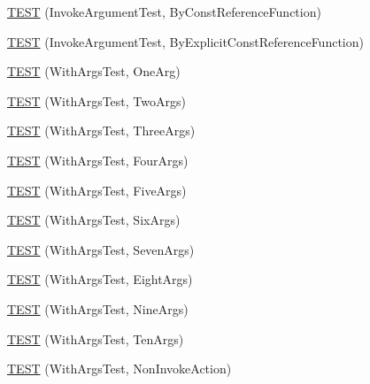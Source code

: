 \begin{DoxyCompactItemize}
\item 
\mbox{\hyperlink{namespacetesting_1_1gmock__generated__actions__test_a82aff636cad2f441c584fc8e3c057d56}{T\+E\+ST}} (Invoke\+Argument\+Test, By\+Const\+Reference\+Function)
\item 
\mbox{\hyperlink{namespacetesting_1_1gmock__generated__actions__test_accb544431629bfb38a618343daaa54c2}{T\+E\+ST}} (Invoke\+Argument\+Test, By\+Explicit\+Const\+Reference\+Function)
\item 
\mbox{\hyperlink{namespacetesting_1_1gmock__generated__actions__test_ae6ef9e9d09c01cd0699a3044fd8c3f1f}{T\+E\+ST}} (With\+Args\+Test, One\+Arg)
\item 
\mbox{\hyperlink{namespacetesting_1_1gmock__generated__actions__test_afadf90d2d0acc55906bfd7f0f43f8a04}{T\+E\+ST}} (With\+Args\+Test, Two\+Args)
\item 
\mbox{\hyperlink{namespacetesting_1_1gmock__generated__actions__test_acae0920fc83b3990663b9d448b8bfd9a}{T\+E\+ST}} (With\+Args\+Test, Three\+Args)
\item 
\mbox{\hyperlink{namespacetesting_1_1gmock__generated__actions__test_ab7046e566f75756b6fe1ec4d92ff7c2b}{T\+E\+ST}} (With\+Args\+Test, Four\+Args)
\item 
\mbox{\hyperlink{namespacetesting_1_1gmock__generated__actions__test_ab51a43ea1c760e001330400d6cec5bfc}{T\+E\+ST}} (With\+Args\+Test, Five\+Args)
\item 
\mbox{\hyperlink{namespacetesting_1_1gmock__generated__actions__test_a167731ec11d5cf4135d95b01dc59e223}{T\+E\+ST}} (With\+Args\+Test, Six\+Args)
\item 
\mbox{\hyperlink{namespacetesting_1_1gmock__generated__actions__test_a04970f4db4de11d91e59ae8769dccea1}{T\+E\+ST}} (With\+Args\+Test, Seven\+Args)
\item 
\mbox{\hyperlink{namespacetesting_1_1gmock__generated__actions__test_a5cbb36915cb29391752600a2a0e9c7e1}{T\+E\+ST}} (With\+Args\+Test, Eight\+Args)
\item 
\mbox{\hyperlink{namespacetesting_1_1gmock__generated__actions__test_aee9acec4535339649dd3067f671cc6c1}{T\+E\+ST}} (With\+Args\+Test, Nine\+Args)
\item 
\mbox{\hyperlink{namespacetesting_1_1gmock__generated__actions__test_a6a818f5a6c2250d3944f90e4331ebc0e}{T\+E\+ST}} (With\+Args\+Test, Ten\+Args)
\item 
\mbox{\hyperlink{namespacetesting_1_1gmock__generated__actions__test_a5380c41df40cb159d58d4c4c81aeac19}{T\+E\+ST}} (With\+Args\+Test, Non\+Invoke\+Action)
\item 

\end{DoxyCompactItemize}
